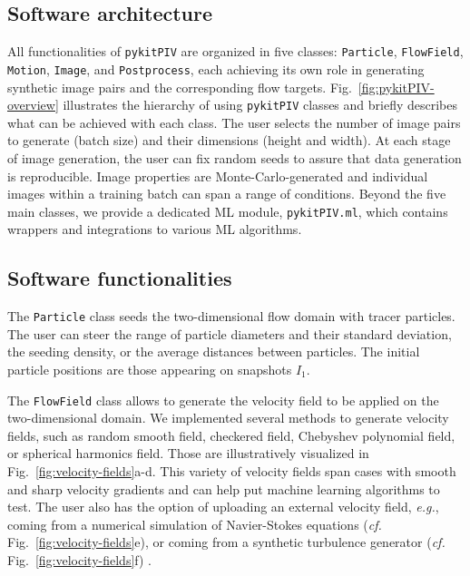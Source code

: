 \documentclass[a4paper,fleqn]{cas-dc}
\begin{document}

\subsection{Software architecture}

All functionalities of \texttt{pykitPIV} are organized in five classes: \texttt{Particle}, \texttt{FlowField}, \texttt{Motion}, \texttt{Image}, and \texttt{Postprocess}, each achieving its own role in generating synthetic image pairs and the corresponding flow targets. Fig.~\ref{fig:pykitPIV-overview} illustrates the hierarchy of using \texttt{pykitPIV} classes and briefly describes what can be achieved with each class. The user selects the number of image pairs to generate (batch size) and their dimensions (height and width). At each stage of image generation, the user can fix random seeds to assure that data generation is reproducible. Image properties are Monte-Carlo-generated and individual images within a training batch can span a range of conditions. Beyond the five main classes, we provide a dedicated ML module, \texttt{pykitPIV.ml}, which contains wrappers and integrations to various ML algorithms.







\subsection{Software functionalities}

The \texttt{Particle} class seeds the two-dimensional flow domain with tracer particles. The user can steer the range of particle diameters and their standard deviation, the seeding density, or the average distances between particles. The initial particle positions are those appearing on snapshots $I_1$.

The \texttt{FlowField} class allows to generate the velocity field to be applied on the two-dimensional domain. We implemented several methods to generate velocity fields, such as random smooth field, checkered field, Chebyshev polynomial field, or spherical harmonics field. Those are illustratively visualized in Fig.~\ref{fig:velocity-fields}a-d. This variety of velocity fields span cases with smooth and sharp velocity gradients and can help put machine learning algorithms to test. The user also has the option of uploading an external velocity field, \textit{e.g.}, coming from a numerical simulation of Navier-Stokes equations (\textit{cf.} Fig.~\ref{fig:velocity-fields}e), or coming from a synthetic turbulence generator (\textit{cf.} Fig.~\ref{fig:velocity-fields}f) \citep{saad2017scalable, richards2018fast}.
\end{document}
